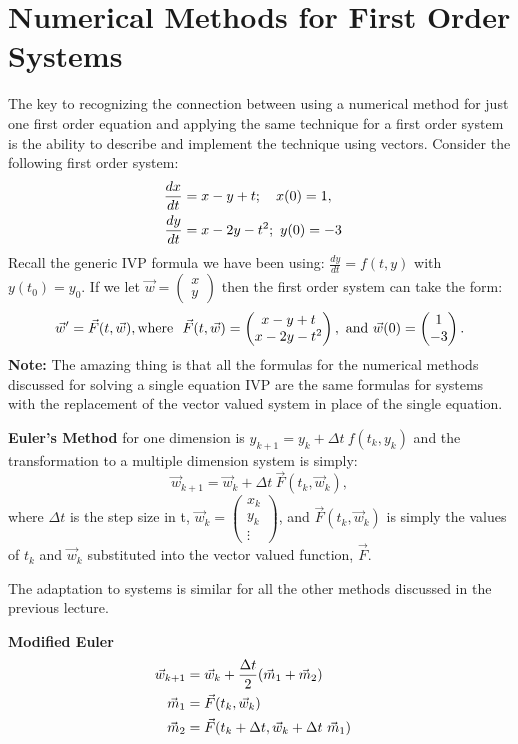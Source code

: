 \documentclass[twoside]{article}
\def\ds{\displaystyle}
\begin{document}
\section{Numerical Methods for First Order Systems}
The key to recognizing the connection between using a numerical method for just one first order equation and applying the same technique for a first order system is the ability to describe and implement the technique using vectors. Consider the following first order system:
\begin{align*}
    \frac {dx}{dt} &= x - y + t; \ \ \ x(0)=1,\cr
     \frac {dy}{dt} &= x - 2y - t^2; \  y(0)=-3
\end{align*}
Recall the generic IVP formula we have been using: $\ds \frac {dy}{dt} = f(t,y)$ with $\ds y(t_0)=y_0$. If we let $\ds \vec w = \begin{pmatrix} x \\ y \end{pmatrix}$ then the first order system can take the form:
$$\vec w ' = \vec F(t,\vec w), {\rm where} \ \ \vec F(t,\vec w) =  \begin{pmatrix} x - y + t \\ x - 2y - t^2 \end{pmatrix}, \ {\rm and} \ \vec w (0) = \begin{pmatrix} 1 \\ -3\end{pmatrix}.$$
{\bf Note: }{\color{teal} The amazing thing is that all the formulas for the numerical methods discussed for solving a single equation IVP are the same formulas for systems with the replacement of the vector valued system in place of the single equation.}

{\bf Euler's Method} for one dimension is $\ds y_{k+1} = y_k + \Delta t  \ f(t_k,y_k)$ and the transformation to a multiple dimension system is simply:
$$\vec w_{k+1} = \vec w_k + \Delta t \ \vec F(t_k,\vec w_k), $$
where $\ds \Delta t$ is the step size in t, $\ds \vec w_k = \begin{pmatrix} x_k \\ y_k \\ \vdots  \end{pmatrix}$, and $\ds \vec F(t_k,\vec w_k)$ is simply the values of $\ds t_k$ and $\ds \vec w_k$ substituted into the vector valued function, $\ds \vec F$. 
\par \noindent 
The adaptation to systems is similar for all the other methods discussed in the previous lecture.
 
 {\bf Modified Euler}
\begin{align*}
    \vec w_{k+1} &= \vec w_k + \frac {\Delta t}2(\vec m_1+\vec m_2) \cr
    \vec m_1 &= \vec F(t_k,\vec w_k) \cr
    \vec m_2 &= \vec F(t_k + \Delta t,\vec w_k+\Delta t\  \vec m_1)
\end{align*}
 
\end{document}
